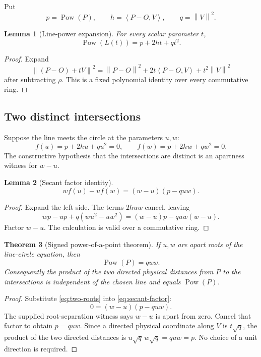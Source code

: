 \documentclass[11pt,letterpaper]{article}
\newtheorem{theorem}{Theorem}[section]
\newtheorem{lemma}[theorem]{Lemma}
\theoremstyle{definition}
\theoremstyle{remark}
\newcommand{\Pow}{\operatorname{Pow}}
\newcommand{\norm}[1]{\left\lVert #1\right\rVert}
\newcommand{\ip}[2]{\left\langle #1,#2\right\rangle}
\begin{document}
Put
\[
 p=\Pow(P),
 \qquad
 h=\ip{P-O}{V},
 \qquad
 q=\norm V^2.
 \tag{7.3}\label{eq:phq}
\]

\begin{lemma}[Line-power expansion]
\label{lem:line-power}
For every scalar parameter \(t\),
\[
 \Pow(L(t))=p+2ht+qt^2.
 \tag{7.4}\label{eq:line-power}
\]
\end{lemma}

\begin{proof}
Expand
\[
 \norm{(P-O)+tV}^2
 =\norm{P-O}^2+2t\ip{P-O}{V}+t^2\norm V^2
\]
after subtracting \(\rho\).  This is a fixed polynomial identity over every
commutative ring.
\end{proof}

\subsection{Two distinct intersections}

Suppose the line meets the circle at the parameters \(u,w\):
\[
 f(u)=p+2hu+qu^2=0,
 \qquad
 f(w)=p+2hw+qw^2=0.
 \tag{7.5}\label{eq:two-roots}
\]
The constructive hypothesis that the intersections are distinct is an
apartness witness for \(w-u\).

\begin{lemma}[Secant factor identity]
\label{lem:secant-factor}
\[
 w f(u)-u f(w)=(w-u)(p-quw).
 \tag{7.6}\label{eq:secant-factor}
\]
\end{lemma}

\begin{proof}
Expand the left side.  The terms \(2huw\) cancel, leaving
\[
 wp-up+q(wu^2-uw^2)
 =(w-u)p-quw(w-u).
\]
Factor \(w-u\).  The calculation is valid over a commutative ring.
\end{proof}

\begin{theorem}[Signed power-of-a-point theorem]
\label{thm:signed-power}
If \(u,w\) are apart roots of the line-circle equation, then
\[
 \Pow(P)=q u w.
 \tag{7.7}\label{eq:signed-power}
\]
Consequently the product of the two directed physical distances from \(P\) to
the intersections is independent of the chosen line and equals
\(\Pow(P)\).
\end{theorem}

\begin{proof}
Substitute \eqref{eq:two-roots} into \eqref{eq:secant-factor}:
\[
 0=(w-u)(p-quw).
\]
The supplied root-separation witness says \(w-u\) is apart from zero.  Cancel
that factor to obtain \(p=quw\).  Since a directed physical coordinate along
\(V\) is \(t\sqrt q\), the product of the two directed distances is
\(u\sqrt q\,w\sqrt q=quw=p\).  No choice of a unit direction is required.
\end{proof}
\end{document}
